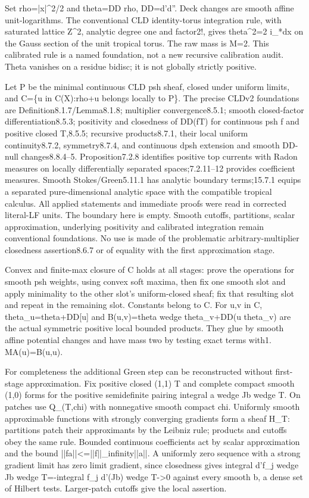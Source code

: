 \documentclass[11pt]{article}
\begin{document}
Set rho=|x|\textasciicircum{}2/2 and theta=DD rho, DD=d'd''. Deck changes are smooth affine unit-logarithms. The conventional CLD identity-torus integration rule, with saturated lattice Z\textasciicircum{}2, analytic degree one and factor2!, gives theta\textasciicircum{}2=2 i\_*dx on the Gauss section of the unit tropical torus. The raw mass is M=2. This calibrated rule is a named foundation, not a new recursive calibration audit. Theta vanishes on a residue bidisc; it is not globally strictly positive.

Let P be the minimal continuous CLD psh sheaf, closed under uniform limits, and C=\{u in C(X):rho+u belongs locally to P\}. The precise CLDv2 foundations are Definition8.1.7/Lemma8.1.8; multiplier convergence8.5.1; smooth closed-factor differentiation8.5.3; positivity and closedness of DD(fT) for continuous psh f and positive closed T,8.5.5; recursive products8.7.1, their local uniform continuity8.7.2, symmetry8.7.4, and continuous dpsh extension and smooth DD-null changes8.8.4--5. Proposition7.2.8 identifies positive top currents with Radon measures on locally differentially separated spaces;7.2.11--12 provides coefficient measures. Smooth Stokes/Green5.11.1 has analytic boundary terms;15.7.1 equips a separated pure-dimensional analytic space with the compatible tropical calculus. All applied statements and immediate proofs were read in corrected literal-LF units. The boundary here is empty. Smooth cutoffs, partitions, scalar approximation, underlying positivity and calibrated integration remain conventional foundations. No use is made of the problematic arbitrary-multiplier closedness assertion8.6.7 or of equality with the first approximation stage.

Convex and finite-max closure of C holds at all stages: prove the operations for smooth psh weights, using convex soft maxima, then fix one smooth slot and apply minimality to the other slot's uniform-closed sheaf; fix that resulting slot and repeat in the remaining slot. Constants belong to C. For u,v in C, theta\_u=theta+DD[u] and B(u,v)=theta wedge theta\_v+DD(u theta\_v) are the actual symmetric positive local bounded products. They glue by smooth affine potential changes and have mass two by testing exact terms with1. MA(u)=B(u,u).

For completeness the additional Green step can be reconstructed without first-stage approximation. Fix positive closed (1,1) T and complete compact smooth (1,0) forms for the positive semidefinite pairing integral a wedge Jb wedge T. On patches use Q\_(T,chi) with nonnegative smooth compact chi. Uniformly smooth approximable functions with strongly converging gradients form a sheaf H\_T: partitions patch their approximants by the Leibniz rule; products and cutoffs obey the same rule. Bounded continuous coefficients act by scalar approximation and the bound ||fa||<=||f||\_infinity||a||. A uniformly zero sequence with a strong gradient limit has zero limit gradient, since closedness gives integral d'f\_j wedge Jb wedge T=-integral f\_j d'(Jb) wedge T->0 against every smooth b, a dense set of Hilbert tests. Larger-patch cutoffs give the local assertion.
\end{document}
